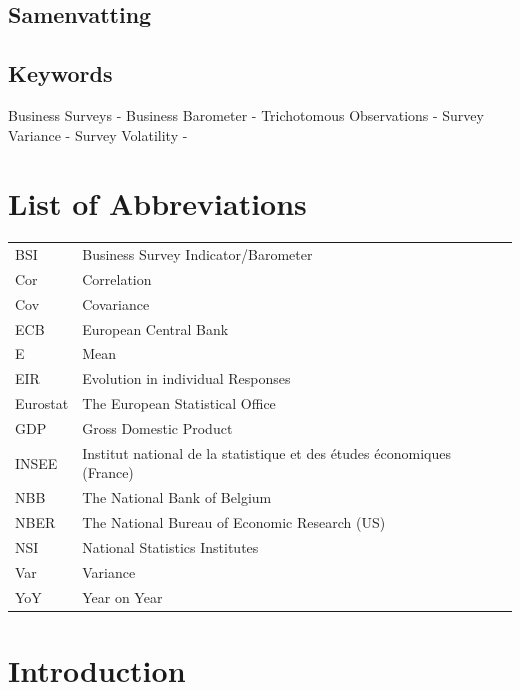 \documentclass[12pt,a4paper,oneside]{book}
\begin{document}
\section*{Samenvatting}


\section*{Keywords}
Business Surveys - 
Business Barometer -
Trichotomous Observations -
Survey Variance - 
Survey Volatility -



\chapter*{List of Abbreviations}

\begin{tabular}{l l}
  BSI       & Business Survey Indicator/Barometer \\
  Cor       & Correlation \\
  Cov       & Covariance \\
  ECB       & European Central Bank \\
  E         & Mean \\
  EIR       & Evolution in individual Responses \\
  Eurostat  & The European Statistical Office \\
  GDP       & Gross Domestic Product \\
  INSEE     & Institut national de la statistique et des études économiques (France) \\
  NBB       & The National Bank of Belgium \\
  NBER      & The National Bureau of Economic Research (US) \\
  NSI       & National Statistics Institutes \\
  Var       & Variance \\
  YoY       & Year on Year
\end{tabular}

\tableofcontents

\newpage
\setcounter{page}{0}


\chapter{Introduction}
\end{document}
